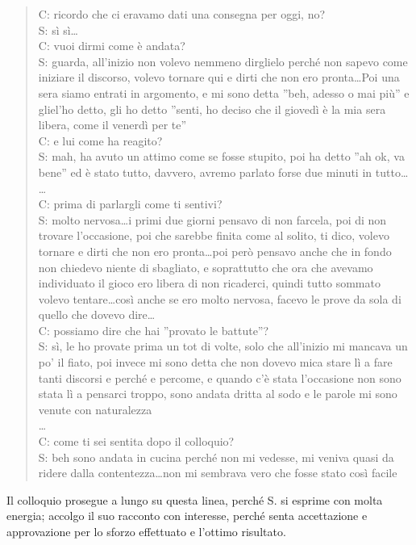 \begin{verse}
C: ricordo che ci eravamo dati una consegna per oggi, no?\\
S: sì sì\ldots\\
C: vuoi dirmi come è andata?\\
S: guarda, all'inizio non volevo nemmeno dirglielo perché non sapevo come iniziare il discorso, volevo tornare qui e dirti che non ero pronta\ldots{}Poi una sera siamo entrati in argomento, e mi sono detta ''beh, adesso o mai più'' e gliel'ho detto, gli ho detto ''senti, ho deciso che il giovedì è la mia sera libera, come il venerdì per te''\\
C: e lui come ha reagito?\\
S: mah, ha avuto un attimo come se fosse stupito, poi ha detto ''ah ok, va bene'' ed è stato tutto, davvero, avremo parlato forse due minuti in tutto\ldots{}\\
\ldots\\
C: prima di parlargli come ti sentivi?\\
S: molto nervosa\ldots{}i primi due giorni pensavo di non farcela, poi di non trovare l'occasione, poi che sarebbe finita come al solito, ti dico, volevo tornare e dirti che non ero pronta\ldots{}poi però pensavo anche che in fondo non chiedevo niente di sbagliato, e soprattutto che ora che avevamo individuato il gioco ero libera di non ricaderci, quindi tutto sommato volevo tentare\ldots{}così anche se ero molto nervosa, facevo le prove da sola di quello che dovevo dire\ldots{}\\
C: possiamo dire che hai ''provato le battute''? \\
S: sì, le ho provate prima un tot di volte, solo che all'inizio mi mancava un po' il fiato, poi invece mi sono detta che non dovevo mica stare lì a fare tanti discorsi e perché e percome, e quando c'è stata l'occasione non sono stata lì a pensarci troppo, sono andata dritta al sodo e le parole mi sono venute con naturalezza\\
\ldots{}\\
C: come ti sei sentita dopo il colloquio?\\
S: beh sono andata in cucina perché non mi vedesse, mi veniva quasi da ridere dalla contentezza\ldots{}non mi sembrava vero che fosse stato così facile
\end{verse}

\noindent Il colloquio prosegue a lungo su questa linea, perché S. si esprime con molta energia; accolgo il suo racconto con interesse, perché senta accettazione e approvazione per lo sforzo effettuato e l'ottimo risultato.

